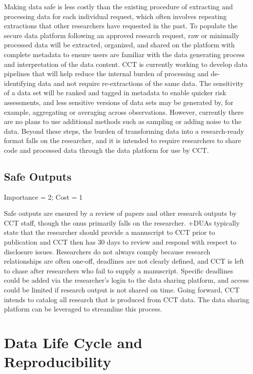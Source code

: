 \documentclass[
]{book}
\begin{document}
Making data safe is less costly than the existing procedure of extracting and processing data for each individual request, which often involves repeating extractions that other researchers have requested in the past. To populate the secure data platform following an approved research request, raw or minimally processed data will be extracted, organized, and shared on the platform with complete metadata to ensure users are familiar with the data generating process and interpretation of the data content. CCT is currently working to develop data pipelines that will help reduce the internal burden of processing and de-identifying data and not require re-extractions of the same data. The sensitivity of a data set will be ranked and tagged in metadata to enable quicker risk assessments, and less sensitive versions of data sets may be generated by, for example, aggregating or averaging across observations. However, currently there are no plans to use additional methods such as sampling or adding noise to the data. Beyond these steps, the burden of transforming data into a research-ready format falls on the researcher, and it is intended to require researchers to share code and processed data through the data platform for use by CCT.

\hypertarget{safe-outputs-6}{%
\subsection{Safe Outputs}\label{safe-outputs-6}}

Importance = 2; Cost = 1

Safe outputs are ensured by a review of papers and other research outputs by CCT staff, though the onus primarily falls on the researcher. +DUAs\textbar{} typically state that the researcher should provide a manuscript to CCT prior to publication and CCT then has 30 days to review and respond with respect to disclosure issues. Researchers do not always comply because research relationships are often one-off, deadlines are not clearly defined, and CCT is left to chase after researchers who fail to supply a manuscript. Specific deadlines could be added via the researcher's login to the data sharing platform, and access could be limited if research output is not shared on time. Going forward, CCT intends to catalog all research that is produced from CCT data. The data sharing platform can be leveraged to streamline this process.

\hypertarget{data-life-cycle-and-reproducibility-1}{%
\section{Data Life Cycle and Reproducibility}\label{data-life-cycle-and-reproducibility-1}}
\end{document}
